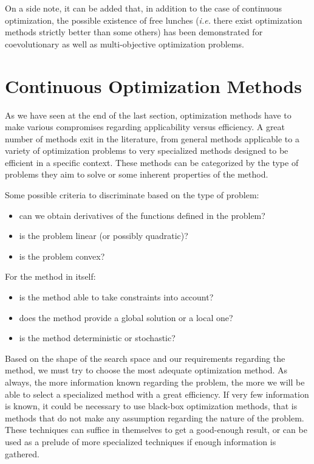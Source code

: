 On a side note, it can be added that, in addition to the case of continuous optimization, the possible existence of free lunches (\emph{i.e.} there exist optimization methods strictly better than some others) has been demonstrated for coevolutionary \cite{1545946} as well as multi-objective \cite{1299403} optimization problems.

\section{Continuous Optimization Methods}

As we have seen at the end of the last section, optimization methods have to make various compromises regarding applicability versus efficiency. A great number of methods exit in the literature, from general methods applicable to a variety of optimization problems to very specialized methods designed to be efficient in a specific context. These methods can be categorized by the type of problems they aim to solve or some inherent properties of the method.

Some possible criteria to discriminate based on the type of problem:
\begin{itemize}
\item can we obtain derivatives of the functions defined in the problem?
\item is the problem linear (or possibly quadratic)?
\item is the problem convex?
\end{itemize}

For the method in itself:
\begin{itemize}
\item is the method able to take constraints into account?
\item does the method provide a global solution or a local one?
\item is the method deterministic or stochastic?
\end{itemize}

Based on the shape of the search space and our requirements regarding the method, we must try to choose the most adequate optimization method. As always, the more information known regarding the problem, the more we will be able to select a specialized method with a great efficiency. If very few information is known, it could be necessary to use black-box optimization methods, that is methods that do not make any assumption regarding the nature of the problem. These techniques can suffice in themselves to get a good-enough result, or can be used as a prelude of more specialized techniques if enough information is gathered.

